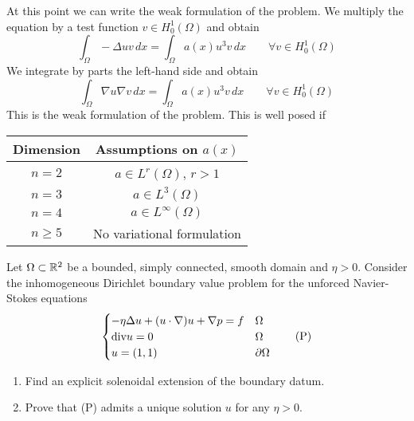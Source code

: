 At this point we can write the weak formulation of the problem. We multiply the
equation by a test function \(v \in H^1_0(\Omega)\) and obtain
\[
    \int_\Omega - \Delta u v \, dx = \int_\Omega a(x) u^3 v \, dx \qquad \forall v \in H^1_0(\Omega)
\]
We integrate by parts the left-hand side and obtain
\[
    \int_\Omega \nabla u \nabla v \, dx = \int_\Omega a(x) u^3 v \, dx \qquad \forall v \in H^1_0(\Omega)
\]
This is the weak formulation of the problem. This is well posed if
\begin{table}[h]
    \centering
    \begin{tabular}{|c|c|}
        \hline
        Dimension  & Assumptions on $a(x)$        \\
        \hline
        $n = 2$    & $a \in L^r(\Omega)$, $r > 1$ \\
        $n = 3$    & $a \in L^3(\Omega)$          \\
        $n = 4$    & $a \in L^\infty(\Omega)$     \\
        $n \geq 5$ & No variational formulation   \\
        \hline
    \end{tabular}
\end{table}

\newpage
\begin{exercise}
    Let \(\Omega \subset \mathbb{R}^2\) be a bounded, simply connected, smooth domain and \(\eta > 0\). Consider the inhomogeneous Dirichlet boundary value problem for the unforced Navier-Stokes equations
    \[
        \begin{cases}
            -\eta \Delta u + (u \cdot \nabla )u + \nabla p = f & \Omega         \\
            \text{div} u = 0                                       & \Omega         \\
            u = (1,1)                                        & \partial\Omega
        \end{cases}
        \tag*{(P)}
    \]
    \begin{enumerate}
        \item Find an explicit solenoidal extension of the boundary datum.
        \item Prove that (P) admits a unique solution \(u\) for any \(\eta > 0\).
    \end{enumerate}
\end{exercise}

